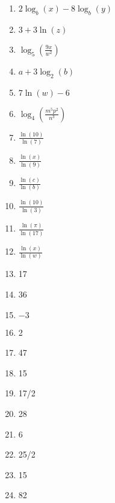 \begin{enumerate}
	\item $2\log_b(x) - 8\log_b(y)$
    \item $3 + 3\ln(z)$
    \item $\log_5\left(\frac{9x}{w^2}\right)$
    \item $a + 3\log_2(b)$
    \item $7\ln(w) - 6$
    \item $\log_4\left(\frac{m^5p^2}{n^3}\right)$
    \item $\frac{\ln(10)}{\ln(7)}$
    \item $\frac{\ln(x)}{\ln(9)}$
    \item $\frac{\ln(c)}{\ln(b)}$
    \item $\frac{\ln(10)}{\ln(3)}$
    \item $\frac{\ln(\pi)}{\ln(17)}$
    \item $\frac{\ln(x)}{\ln(w)}$
    \item 17
    \item 36
    \item $-3$
    \item 2
    \item 47
    \item 15
    \item 17/2
    \item 28
    \item 6
    \item 25/2
    \item 15
    \item 82
\end{enumerate}